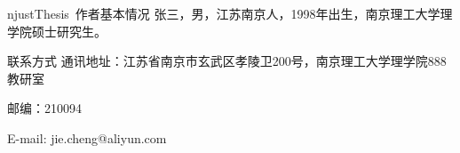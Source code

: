 \begin{resume}

    \begin{resumesection}{njustThesis~作者基本情况}
        张三，男，江苏南京人，1998年出生，南京理工大学理学院硕士研究生。
    \end{resumesection}

    \begin{resumelist}{联系方式}
        通讯地址：江苏省南京市玄武区孝陵卫200号，南京理工大学理学院888教研室

        邮编：210094

        E-mail: jie.cheng@aliyun.com
    \end{resumelist}

\end{resume}
